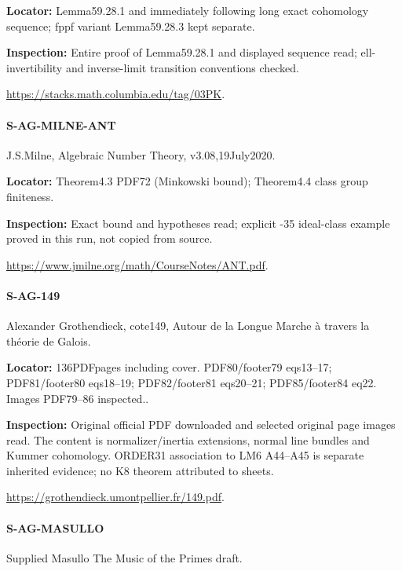\documentclass[11pt,a4paper]{article}
\begin{document}
\textbf{Locator:} Lemma59.\allowbreak{}28.\allowbreak{}1 and immediately following long exact cohomology sequence; fppf variant Lemma59.\allowbreak{}28.\allowbreak{}3 kept separate.

\textbf{Inspection:} Entire proof of Lemma59.\allowbreak{}28.\allowbreak{}1 and displayed sequence read; ell-invertibility and inverse-limit transition conventions checked.\allowbreak{}

\url{https://stacks.math.columbia.edu/tag/03PK}.

\paragraph{S-AG-MILNE-ANT} J.\allowbreak{}S.\allowbreak{}Milne, Algebraic Number Theory, v3.\allowbreak{}08,19July2020.

\textbf{Locator:} Theorem4.\allowbreak{}3 PDF72 (Minkowski bound); Theorem4.\allowbreak{}4 class group finiteness.

\textbf{Inspection:} Exact bound and hypotheses read; explicit -35 ideal-class example proved in this run, not copied from source.\allowbreak{}

\url{https://www.jmilne.org/math/CourseNotes/ANT.pdf}.

\paragraph{S-AG-149} Alexander Grothendieck, cote149, Autour de la Longue Marche à travers la théorie de Galois.

\textbf{Locator:} 136PDFpages including cover.\allowbreak{} PDF80/\allowbreak{}footer79 eqs13–\allowbreak{}17; PDF81/\allowbreak{}footer80 eqs18–\allowbreak{}19; PDF82/\allowbreak{}footer81 eqs20–\allowbreak{}21; PDF85/\allowbreak{}footer84 eq22.\allowbreak{} Images PDF79–\allowbreak{}86 inspected.\allowbreak{}.

\textbf{Inspection:} Original official PDF downloaded and selected original page images read.\allowbreak{} The content is normalizer/\allowbreak{}inertia extensions, normal line bundles and Kummer cohomology.\allowbreak{} ORDER31 association to LM6 A44–\allowbreak{}A45 is separate inherited evidence; no K8 theorem attributed to sheets.\allowbreak{}

\url{https://grothendieck.umontpellier.fr/149.pdf}.

\paragraph{S-AG-MASULLO} Supplied Masullo The Music of the Primes draft.
\end{document}
